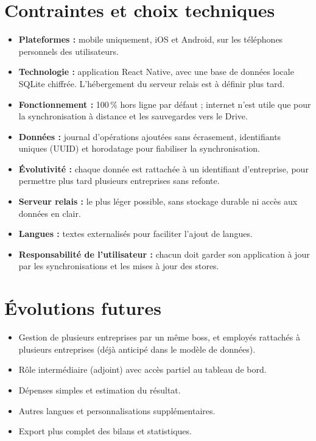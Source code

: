 \documentclass[11pt,a4paper]{article}
\begin{document}
	\section{Contraintes et choix techniques}
	\begin{itemize}[leftmargin=*]
		\item \textbf{Plateformes :} mobile uniquement, iOS et Android, sur les téléphones personnels des utilisateurs.
		\item \textbf{Technologie :} application React Native, avec une base de données locale SQLite chiffrée. L'hébergement du serveur relais est à définir plus tard.
		\item \textbf{Fonctionnement :} 100\,\% hors ligne par défaut ; internet n'est utile que pour la synchronisation à distance et les sauvegardes vers le Drive.
		\item \textbf{Données :} journal d'opérations ajoutées sans écrasement, identifiants uniques (UUID) et horodatage pour fiabiliser la synchronisation.
		\item \textbf{Évolutivité :} chaque donnée est rattachée à un identifiant d'entreprise, pour permettre plus tard plusieurs entreprises sans refonte.
		\item \textbf{Serveur relais :} le plus léger possible, sans stockage durable ni accès aux données en clair.
		\item \textbf{Langues :} textes externalisés pour faciliter l'ajout de langues.
		\item \textbf{Responsabilité de l'utilisateur :} chacun doit garder son application à jour par les synchronisations et les mises à jour des stores.
	\end{itemize}
	
	\section{Évolutions futures}
	\begin{itemize}[leftmargin=*]
		\item Gestion de plusieurs entreprises par un même boss, et employés rattachés à plusieurs entreprises (déjà anticipé dans le modèle de données).
		\item Rôle intermédiaire (adjoint) avec accès partiel au tableau de bord.
		\item Dépenses simples et estimation du résultat.
		\item Autres langues et personnalisations supplémentaires.
		\item Export plus complet des bilans et statistiques.
	\end{itemize}
	

	
\end{document}
